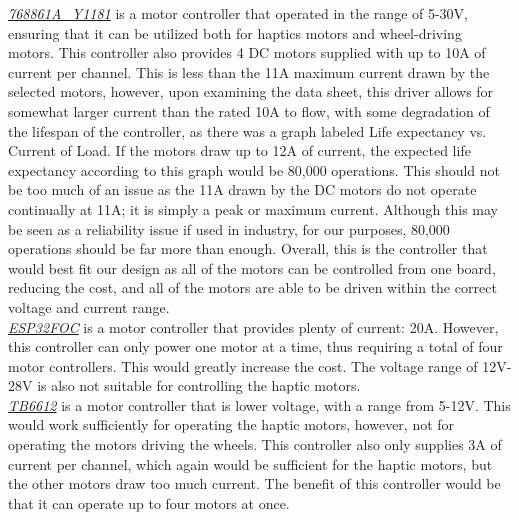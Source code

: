 \noindent \underline{\textit{768861A\_Y1181}} is a motor controller that operated in the range of 5-30V, ensuring that it can be utilized both for haptics motors and wheel-driving motors. This controller also provides 4 DC motors supplied with up to 10A of current per channel. This is less than the 11A maximum current drawn by the selected motors, however, upon examining the data sheet, this driver allows for somewhat larger current than the rated 10A to flow, with some degradation of the lifespan of the controller, as there was a graph labeled Life expectancy vs. Current of Load. If the motors draw up to 12A of current, the expected life expectancy according to this graph would be 80,000 operations. This should not be too much of an issue as the 11A drawn by the DC motors do not operate continually at 11A; it is simply a peak or maximum current. Although this may be seen as a reliability issue if used in industry, for our purposes, 80,000 operations should be far more than enough.  Overall, this is the controller that would best fit our design as all of the motors can be controlled from one board, reducing the cost, and all of the motors are able to be driven within the correct voltage and current range.\\

\noindent \underline{\textit{ESP32FOC}} is a motor controller that provides plenty of current: 20A. However, this controller can only power one motor at a time, thus requiring a total of four motor controllers. This would greatly increase the cost. The voltage range of 12V-28V is also not suitable for controlling the haptic motors.\\

\noindent \underline{\textit{TB6612}} is a motor controller that is lower voltage, with a range from 5-12V. This would work sufficiently for operating the haptic motors, however, not for operating the motors driving the wheels. This controller also only supplies 3A of current per channel, which again would be sufficient for the haptic motors, but the other motors draw too much current. The benefit of this controller would be that it can operate up to four motors at once.\\

